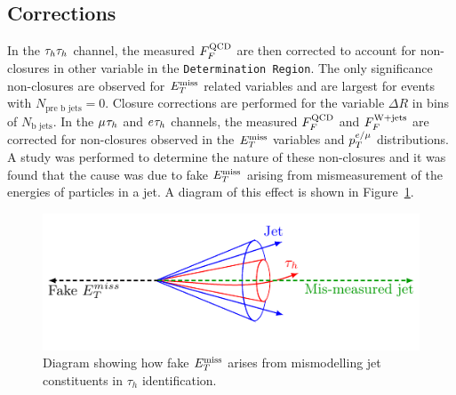 \subsection{Corrections}

In the $\tau_{h}\tau_{h}$ channel, the measured $F_{F}^{\text{QCD}}$ are then corrected to account for non-closures in other variable in the \texttt{Determination Region}. 
The only significance non-closures are observed for $E_{T}^{\text{miss}}$ related variables and are largest for events with $N_{\text{pre b jets}}=0$. 
Closure corrections are performed for the variable $\Delta R$ in bins of $N_{\text{b jets}}$.
In the $\mu_{}\tau_{h}$ and $e_{}\tau_{h}$ channels, the measured $F_{F}^{\text{QCD}}$ and $F_{F}^{\text{W+jets}}$ are corrected for non-closures observed in the $E_{T}^{\text{miss}}$ variables and $p_{T}^{e/\mu}$ distributions.
A study was performed to determine the nature of these non-closures and it was found that the cause was due to fake $E_{T}^{\text{miss}}$ arising from mismeasurement of the energies of particles in a jet. 
A diagram of this effect is shown in Figure~\ref{fig:fakemet}. \\

\begin{figure}[!hbtp]
\centering
   \includegraphics[width=\textwidth]{Figures/fakemet_plot.pdf}
\caption{Diagram showing how fake $E_{T}^{\text{miss}}$ arises from mismodelling jet constituents in $\tau_h$ identification.}
\label{fig:fakemet}
\end{figure}

